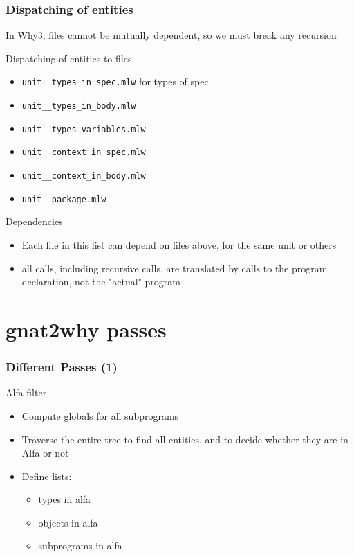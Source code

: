 \documentclass{beamer}
\newenvironment{specialframe}{%
  \begin{frame}[fragile,environment=specialframe]}{\end{frame}}
\begin{document}
\begin{specialframe}\frametitle{Dispatching of entities}

In Why3, files cannot be mutually dependent, so we must break any recursion

   \begin{block}{Dispatching of entities to files}
      \begin{itemize}
         \item \verb|unit__types_in_spec.mlw| for types of spec
         \item \verb|unit__types_in_body.mlw|
         \item \verb|unit__types_variables.mlw|
         \item \verb|unit__context_in_spec.mlw|
         \item \verb|unit__context_in_body.mlw|
         \item \verb|unit__package.mlw|
      \end{itemize}
   \end{block}
   \begin{block}{Dependencies}
      \begin{itemize}
         \item Each file in this list can depend on files above, for the same unit or others
         \item all calls, including recursive calls, are translated by calls to
the program declaration, not the "actual" program
      \end{itemize}
   \end{block}
\end{specialframe}

\section{gnat2why passes}

\begin{specialframe}\frametitle{Different Passes (1)}

   \begin{block}{Alfa filter}
      \begin{itemize}
         \item Compute globals for all subprograms
         \item Traverse the entire tree to find all entities, and to decide
            whether they are in Alfa or not
         \item Define lists:
            \begin{itemize}
                  \item types in alfa
                  \item objects in alfa
                  \item subprograms in alfa
            \end{itemize}
      \end{itemize}
   \end{block}
\end{specialframe}
\end{document}
